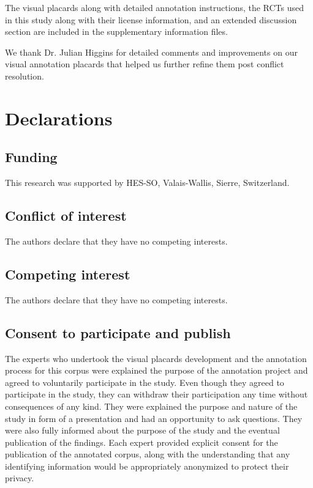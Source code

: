 \documentclass[sn-mathphys,Numbered]{sn-jnl}%
\theoremstyle{thmstyleone}%
\theoremstyle{thmstyletwo}%
\theoremstyle{thmstylethree}%
\begin{document}
%
The visual placards along with detailed annotation instructions, the RCTs used in this study along with their license information, and an extended discussion section are included in the supplementary information files.
%
%
%


We thank Dr. Julian Higgins for detailed comments and improvements on our visual annotation placards that helped us further refine them post conflict resolution. 
%
%
%
\section*{Declarations}
%
\subsection*{Funding}
%
This research was supported by HES-SO, Valais-Wallis, Sierre, Switzerland. 
%
%
%
\subsection*{Conflict of interest}
%
The authors declare that they have no competing interests.
%
%
%
\subsection*{Competing interest}
%
The authors declare that they have no competing interests.
%
%
%
%
%
%
%
\subsection*{Consent to participate and publish}
%
The experts who undertook the visual placards development and the annotation process for this corpus were explained the purpose of the annotation project and agreed to voluntarily participate in the study.
Even though they agreed to participate in the study, they can withdraw their participation any time without consequences of any kind.
They were explained the purpose and nature of the study in form of a presentation and had an opportunity to ask questions.
They were also fully informed about the purpose of the study and the eventual publication of the findings.
Each expert provided explicit consent for the publication of the annotated corpus, along with the understanding that any identifying information would be appropriately anonymized to protect their privacy. 
%
%
%
\end{document}
